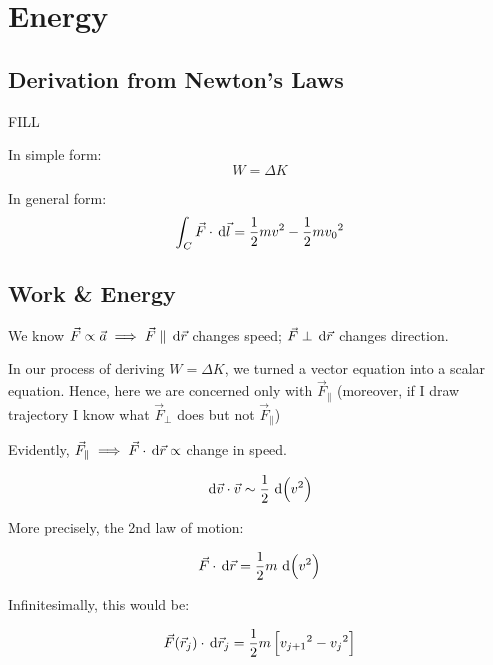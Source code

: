 \chapter{Energy}

\section{Derivation from Newton's Laws}

FILL

\begin{theorem}
	In simple form:
	\begin{equation}
		W = \Delta K
	\end{equation}

	In general form:
	\begin{equation}
		\int_C \vec F \cdot \D \vec l = \frac{1}{2}mv^2 - \frac{1}{2}m{v_0}^2
	\end{equation}
\end{theorem}

\section{Work \& Energy}

We know $\vec F \propto \vec a \implies \vec F \parallel \D \vec r$ changes speed; $\vec F \perp \D \vec r$ changes direction.

In our process of deriving $W = \Delta K$, we turned a vector equation into a scalar equation. Hence, here we are concerned only with $\vec F_\parallel$ (moreover, if I draw trajectory I know what $\vec F_\perp$ does but not $\vec F_\parallel$)

Evidently, $\vec F_\parallel \implies \vec F \cdot \D \vec r \propto$ change in speed.

\begin{equation}
	\D \vec v \cdot \vec v \sim \frac{1}{2}\D(v^2)
\end{equation}

More precisely, the 2nd law of motion:

\begin{equation}
	\vec F \cdot \D \vec r = \frac{1}{2} m \D(v^2)
\end{equation}

Infinitesimally, this would be:

\begin{equation}
	\vec F(\vec r_j) \cdot \D \vec r_j = \frac{1}{2} m \left[{v_{j+1}}^2 - {v_j}^2\right]
\end{equation}

